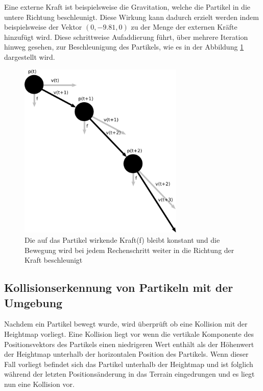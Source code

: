 \begin{Spacing}{\mylinespace}
        Eine externe Kraft ist beispielsweise die Gravitation, welche die Partikel
        in die untere Richtung beschleunigt. Diese Wirkung kann dadurch erzielt
        werden indem beispielsweise der Vektor $( 0,-9.81,0 )$ zu der Menge der externen
        Kräfte hinzufügt wird.
		Diese schrittweise Aufaddierung führt, über mehrere Iteration hinweg gesehen,
		zur Beschleunigung des Partikels, wie es in der Abbildung \ref{fig:bewmod} dargestellt wird.
		\begin{figure}[h!]
			\centering
			\vspace*{30px}
			\includegraphics[width=0.7\textwidth]{graphics/Phys_bew3.png}
			\caption{Die auf das Partikel wirkende Kraft(f) bleibt konstant und
			die Bewegung wird bei jedem Rechenschritt weiter in die Richtung der
			Kraft beschleunigt}
			\label{fig:bewmod}
		\end{figure}

    \subsection{Kollisionserkennung von Partikeln mit der Umgebung}
    	Nachdem ein Partikel bewegt wurde, wird überprüft ob eine Kollision mit
    	der Heightmap vorliegt. Eine Kollision liegt vor wenn die vertikale Komponente
    	des Positionsvektors des Partikels einen niedrigeren Wert enthält als der
    	Höhenwert der Heightmap unterhalb der horizontalen Position des Partikels. Wenn dieser Fall
    	vorliegt befindet sich das Partikel unterhalb der Heightmap und ist
    	folglich während der letzten Positionsänderung in das Terrain eingedrungen
    	und es liegt nun eine Kollision vor.


\end{Spacing}
